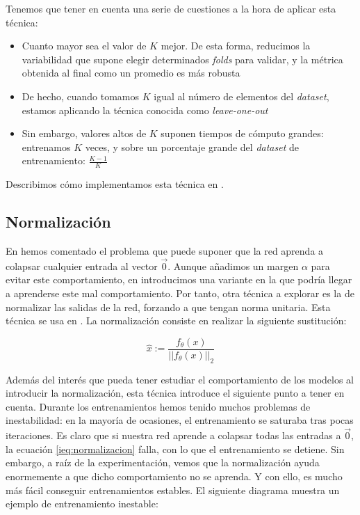 Tenemos que tener en cuenta una serie de cuestiones a la hora de aplicar esta técnica:

\begin{itemize}
    \item Cuanto mayor sea el valor de $K$ mejor. De esta forma, reducimos la variabilidad que supone elegir determinados \textit{folds} para validar, y la métrica obtenida al final como un promedio es más robusta
    \item De hecho, cuando tomamos $K$ igual al número de elementos del \textit{dataset}, estamos aplicando la técnica conocida como \textit{leave-one-out} \cite{informatica:kfold_cross_val_paper}
    \item Sin embargo, valores altos de $K$ suponen tiempos de cómputo grandes: entrenamos $K$ veces, y sobre un porcentaje grande del \textit{dataset} de entrenamiento: $\frac{K - 1}{K}$
\end{itemize}

Describimos cómo implementamos esta técnica en .

\subsection{Normalización} \label{isubs:normalizacion_teoria}

En  hemos comentado el problema que puede suponer que la red aprenda a colapsar cualquier entrada al vector $\vec{0}$. Aunque añadimos un margen $\alpha$ para evitar este comportamiento, en  introducimos una variante en la que podría llegar a aprenderse este mal comportamiento. Por tanto, otra técnica a explorar es la de normalizar las salidas de la red, forzando a que tengan norma unitaria. Esta técnica se usa en \cite{informatica:facenet}. La normalización consiste en realizar la siguiente sustitución:

\begin{equation} \label{ieq:normalizacion}
    \hat{x} := \frac{f_{\theta}(x)}{||f_{\theta}(x)||_2}
\end{equation}

Además del interés que pueda tener estudiar el comportamiento de los modelos al introducir la normalización, esta técnica introduce el siguiente punto a tener en cuenta. Durante los entrenamientos hemos tenido muchos problemas de inestabilidad:  en la mayoría de ocasiones, el entrenamiento se saturaba tras pocas iteraciones. Es claro que si nuestra red aprende a colapsar todas las entradas a $\vec{0}$, la ecuación \eqref{ieq:normalizacion} falla, con lo que el entrenamiento se detiene. Sin embargo, a raíz de la experimentación, vemos que la normalización ayuda enormemente a que dicho comportamiento no se aprenda. Y con ello, es mucho más fácil conseguir entrenamientos estables. El siguiente diagrama muestra un ejemplo de entrenamiento inestable:

